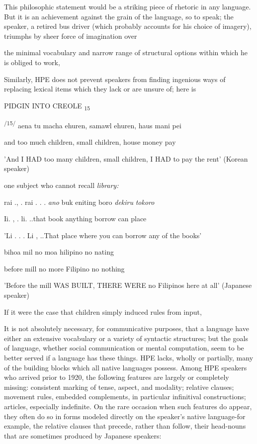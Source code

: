 This philosophic statement would be a striking piece of rhetoric in any language. But it is an achievement against the grain of the language, so to speak; the speaker, a retired bus driver (which probably accounts for his choice of imagery), triumphs by sheer force of imagination over


the minimal vocabulary and narrow range of structural options within which he is obliged to work,

Similarly, HPE does not prevent speakers from finding ingenious ways of replacing lexical items which they lack or are unsure of; here is

PIDGIN INTO CREOLE\textsubscript{ 15}

\textsuperscript{/15/ }aena tu macha ehuren, samawl ehuren, haus mani pei

and too much children, small children, house money pay

'And I HAD too many children, small children, I HAD to pay the rent' (Korean speaker)

one subject who cannot recall \textit{library:}

\ea\label{ex:13}
 rai ., . rai . . . \textit{ano} buk eniting boro \textit{dekiru} \textit{tokoro}
\glt
\z

Ii. , . li. ..that book anything borrow can place

'Li . . . Li , ..That place where you can borrow any of the books'

\ea\label{ex:16}

\glt
\z

bihoa mil no moa hilipino no nating

before mill no more Filipino no nothing

'Before the mill WAS BUILT, THERE WERE no Filipinos here at all' (Japanese speaker)

If it were the case that children simply induced rules from input,

It is not absolutely necessary, for communicative purposes, that a language have either an extensive vocabulary or a variety of syntactic structures; but the goals of language, whether social communication or mental computation, seem to be better served if a language has these things. HPE lacks, wholly or partially, many of the building blocks which all native languages possess. Among HPE speakers who arrived prior to 1920, the following features are largely or completely missing: consistent marking of tense, aspect, and modality; relative clauses; movement rules, embedded complements, in particular infinitival con\-structions; articles, especially indefinite. On the rare occasion when such features do appear, they often do so in forms modeled directly on the speaker's native language{}-for example, the relative clauses that precede, rather than follow, their head-nouns that are sometimes produced by Japanese speakers:

